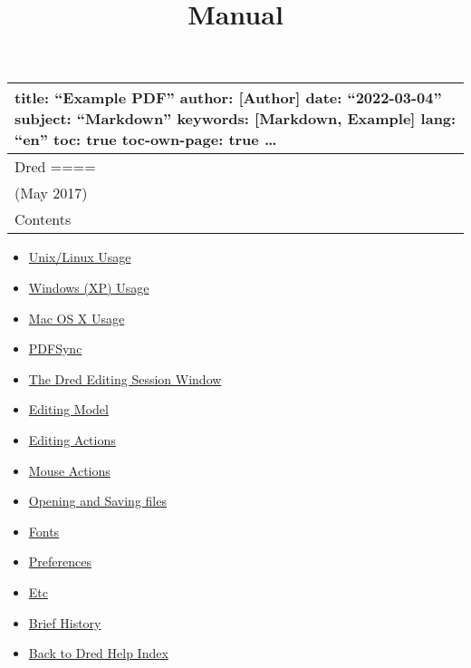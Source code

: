 \documentclass[
]{article}
\title{Manual}
\author{}
\date{}
\providecommand{\tightlist}{%
  \setlength{\itemsep}{0pt}\setlength{\parskip}{0pt}}
\begin{document}
\maketitle

\begin{longtable}[]{@{}l@{}}
\toprule
\begin{minipage}[b]{0.42\columnwidth}\raggedright
title: ``Example PDF'' author: {[}Author{]} date: ``2022-03-04''
subject: ``Markdown'' keywords: {[}Markdown, Example{]} lang: ``en''
toc: true toc-own-page: true \ldots{}\strut
\end{minipage}\tabularnewline
\midrule
\endhead
\begin{minipage}[t]{0.42\columnwidth}\raggedright
Dred ====\strut
\end{minipage}\tabularnewline
\begin{minipage}[t]{0.42\columnwidth}\raggedright
(May 2017)\strut
\end{minipage}\tabularnewline
\begin{minipage}[t]{0.42\columnwidth}\raggedright
Contents\strut
\end{minipage}\tabularnewline
\bottomrule
\end{longtable}

\begin{itemize}
\tightlist
\item
  \protect\hyperlink{Unixux2fLinuxux5cux2520Usage}{Unix/Linux Usage}
\item
  \protect\hyperlink{Windowsux5cux2520ux28XPux29ux5cux2520Usage}{Windows
  (XP) Usage}
\item
  \protect\hyperlink{MACOS}{Mac OS X Usage}
\item
  \protect\hyperlink{PDFSync}{PDFSync}
\item
  \protect\hyperlink{Theux5cux2520Dredux5cux2520Editingux5cux2520Sessionux5cux2520Window}{The
  Dred Editing Session Window}
\item
  \protect\hyperlink{Editingux5cux2520Model}{Editing Model}
\item
  \protect\hyperlink{Editingux5cux2520Actions}{Editing Actions}
\item
  \protect\hyperlink{Mouseux5cux2520Actions}{Mouse Actions}
\item
  \protect\hyperlink{Openingux5cux2520andux5cux2520Savingux5cux2520files}{Opening
  and Saving files}
\item
  \protect\hyperlink{Fonts}{Fonts}
\item
  \protect\hyperlink{Preferences}{Preferences}
\item
  \protect\hyperlink{Etc}{Etc}
\item
  \protect\hyperlink{Briefux5cux2520History}{Brief History}
\item
  \href{index.html}{Back to Dred Help Index}
\end{itemize}
\end{document}
